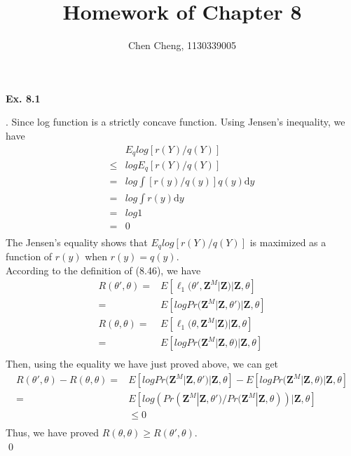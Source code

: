 \documentclass[12pt]{article}
\newenvironment{sol}
  {\par\vspace{3mm}\noindent{\it Solution}.}
  {\qed}
\begin{document}
\author{Chen Cheng, 1130339005}
\title{Homework of Chapter 8}
\maketitle
\begin{flushleft}
\textbf{Ex. 8.1}
\end{flushleft}

\begin{sol}
Since log function is a strictly concave function. Using Jensen's inequality, we have
\begin{equation*}
\begin{split}
&E_qlog[r(Y)/q(Y)]\\
\leq&logE_q[r(Y)/q(Y)]\\
=&log\int[r(y)/q(y)]q(y)\mathrm{d}y\\
=&log\int r(y)\mathrm{d}y\\
=&log 1\\
=&0\\
\end{split}
\end{equation*}
The Jensen's equality shows that $E_qlog[r(Y)/q(Y)]$ is maximized as a function of $r(y)$ when $r(y)=q(y)$.\\
According to the definition of (8.46), we have
\begin{equation*}
\begin{split}
R(\theta',\theta)=&E[\ell_1(\theta',\mathbf{Z}^M|\mathbf{Z})|\mathbf{Z},\theta]\\
=&E[logPr(\mathbf{Z}^M|\mathbf{Z},\theta')|\mathbf{Z},\theta]\\
R(\theta,\theta)=&E[\ell_1(\theta,\mathbf{Z}^M|\mathbf{Z})|\mathbf{Z},\theta]\\
=&E[logPr(\mathbf{Z}^M|\mathbf{Z},\theta)|\mathbf{Z},\theta]\\
\end{split}
\end{equation*}
Then, using the equality we have just proved above, we can get
\begin{equation*}
\begin{split}
R(\theta',\theta)-R(\theta,\theta)=
&E[logPr(\mathbf{Z}^M|\mathbf{Z},\theta')|\mathbf{Z},\theta]-E[logPr(\mathbf{Z}^M|\mathbf{Z},\theta)|\mathbf{Z},\theta]\\
=&E[log(Pr(\mathbf{Z}^M|\mathbf{Z},\theta')/Pr(\mathbf{Z}^M|\mathbf{Z},\theta))|\mathbf{Z},\theta]\\
&\leq0\\
\end{split}
\end{equation*}
Thus, we have proved $R(\theta,\theta)\geq R(\theta',\theta)$.\\
\end{sol}
\end{document}
